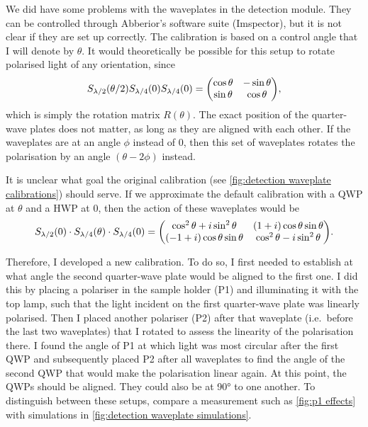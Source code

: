 We did have some problems with the waveplates in the detection module. They can be controlled through Abberior's software suite (Imspector), but it is not clear if they are set up correctly. The calibration is based on a control angle that I will denote by $ \theta $. It would theoretically be possible for this setup to rotate polarised light of any orientation, since
\begin{equation}
	S_\hwp(\theta/2) S_\qwp(0) S_\qwp(0) = \mqty(\cos\theta & -\sin\theta \\ \sin\theta & \cos\theta ),
	\label{eq:detection waveplates}
\end{equation}
which is simply the rotation matrix $ R(\theta) $. The exact position of the quarter-wave plates does not matter, as long as they are aligned with each other. If the waveplates are at an angle $ \phi $ instead of 0, then this set of waveplates rotates the polarisation by an angle $ (\theta-2\phi) $ instead. 

It is unclear what goal the original calibration (see \autoref{fig:detection waveplate calibrations}) should serve. If we approximate the default calibration with a QWP at $ \theta $ and a HWP at 0, then the action of these waveplates would be
\begin{equation}
	S_\hwp(0)\cdot S_\qwp(\theta)\cdot S_\qwp(0) = 
		\mqty( \cos^2\theta + i\sin^2\theta & (1+i)\cos\theta\sin\theta \\
			   (-1+i)\cos\theta\sin\theta   & \cos^2\theta - i\sin^2\theta 
	    ).
\end{equation}

Therefore, I developed a new calibration. To do so, I first needed to establish at what angle the second quarter-wave plate would be aligned to the first one. I did this by placing a polariser in the sample holder (P1) and illuminating it with the top lamp, such that the light incident on the first quarter-wave plate was linearly polarised. Then I placed another polariser (P2) after that waveplate (i.e.~before the last two waveplates) that I rotated to assess the linearity of the polarisation there. I found the angle of P1 at which light was most circular after the first QWP and subsequently placed P2 after all waveplates to find the angle of the second QWP that would make the polarisation linear again. At this point, the QWPs should be aligned. They could also be at \ang{90} to one another. To distinguish between these setups, compare a measurement such as \autoref{fig:p1 effects} with simulations in \autoref{fig:detection waveplate simulations}.

